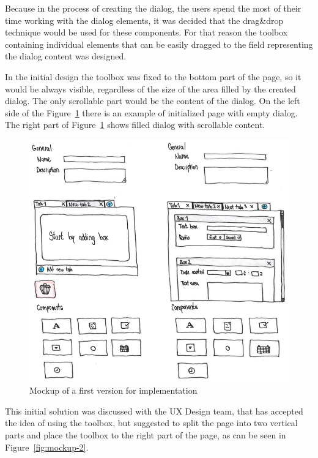 Because in the process of creating the dialog, the users spend the most of
their time working with the dialog elements, it was decided that the
drag\&drop technique would be used for these components.
For that reason the toolbox containing individual elements that can be easily
dragged to the field representing the dialog content was designed.

In the initial design the toolbox was fixed to the bottom part of the page,
so it would be always visible, regardless of the size of the area filled by
the created dialog.
The only scrollable part would be the content of the dialog.
On the left side of the Figure~\ref{fig:mockup-1} there is an example of
initialized page with empty dialog. The right part of Figure~\ref{fig:mockup-1}
shows filled dialog with scrollable content.

\begin{figure}
  \centering
  \def\svgwidth{\columnwidth}
  \includegraphics[width=15cm,keepaspectratio]{fig/mockup-1}
  \caption{Mockup of a first version for implementation}\label{fig:mockup-1}
\end{figure}

This initial solution was discussed with the UX Design team, that has accepted
the idea of using the toolbox, but suggested to split the page into two
vertical parts and place the toolbox to the right part of the page, as can be
seen in Figure~\ref{fig:mockup-2}.

